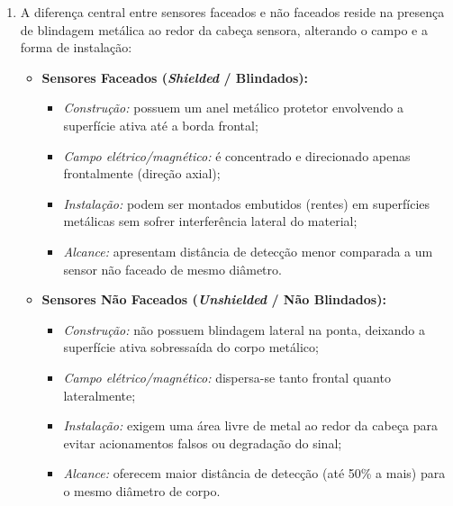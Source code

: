 \begin{enumerate}[label=\textbf{\arabic*)}, leftmargin=*]
    \item A diferença central entre sensores faceados e não faceados reside na presença de blindagem metálica ao redor da cabeça sensora, alterando o campo e a forma de instalação:
        \begin{itemize}
            \item \textbf{Sensores Faceados (\textit{Shielded} / Blindados):}
                \begin{itemize}
                    \item \textit{Construção:} possuem um anel metálico protetor envolvendo a superfície ativa até a borda frontal;
                    \item \textit{Campo elétrico/magnético:} é concentrado e direcionado apenas frontalmente (direção axial);
                    \item \textit{Instalação:} podem ser montados embutidos (rentes) em superfícies metálicas sem sofrer interferência lateral do material;
                    \item \textit{Alcance:} apresentam distância de detecção menor comparada a um sensor não faceado de mesmo diâmetro.
                \end{itemize}
            \item \textbf{Sensores Não Faceados (\textit{Unshielded} / Não Blindados):}
                \begin{itemize}
                    \item \textit{Construção:} não possuem blindagem lateral na ponta, deixando a superfície ativa sobressaída do corpo metálico;
                    \item \textit{Campo elétrico/magnético:} dispersa-se tanto frontal quanto lateralmente;
                    \item \textit{Instalação:} exigem uma área livre de metal ao redor da cabeça para evitar acionamentos falsos ou degradação do sinal;
                    \item \textit{Alcance:} oferecem maior distância de detecção (até 50\% a mais) para o mesmo diâmetro de corpo.
                \end{itemize}
        \end{itemize}

\end{enumerate}